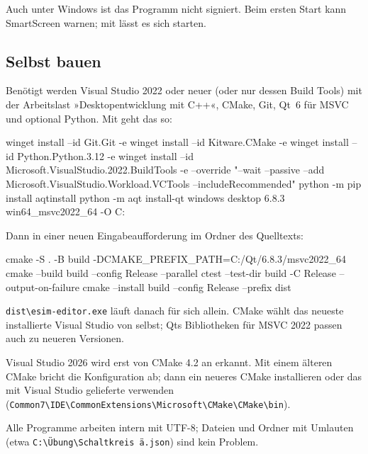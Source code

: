 \begin{hinweis}[SmartScreen]
  Auch unter Windows ist das Programm nicht signiert. Beim ersten Start kann
  SmartScreen warnen; mit \pfad{} lässt es sich starten.
\end{hinweis}

\subsection{Selbst bauen}

Benötigt werden Visual Studio 2022 oder neuer (oder nur dessen Build Tools)
mit der Arbeitslast »Desktopentwicklung mit C++«, CMake, Git, Qt~6 für MSVC
und optional Python. Mit  geht das so:

\begin{shell}
winget install --id Git.Git -e
winget install --id Kitware.CMake -e
winget install --id Python.Python.3.12 -e
winget install --id Microsoft.VisualStudio.2022.BuildTools -e --override "--wait --passive --add Microsoft.VisualStudio.Workload.VCTools --includeRecommended"
python -m pip install aqtinstall
python -m aqt install-qt windows desktop 6.8.3 win64_msvc2022_64 -O C:\Qt
\end{shell}

Dann in einer neuen Eingabeaufforderung im Ordner des Quelltexts:

\begin{shell}
cmake -S . -B build -DCMAKE_PREFIX_PATH=C:/Qt/6.8.3/msvc2022_64
cmake --build build --config Release --parallel
ctest --test-dir build -C Release --output-on-failure
cmake --install build --config Release --prefix dist
\end{shell}

\texttt{dist\textbackslash esim-editor.exe} läuft danach für sich allein.
CMake wählt das neueste installierte Visual Studio von selbst; Qts
Bibliotheken für MSVC 2022 passen auch zu neueren Versionen.

\begin{achtung}
  Visual Studio 2026 wird erst von CMake 4.2 an erkannt. Mit einem älteren
  CMake bricht die Konfiguration ab; dann ein neueres CMake installieren
  oder das mit Visual Studio gelieferte verwenden
  (\texttt{Common7\textbackslash\allowbreak IDE\textbackslash CommonExtensions\textbackslash Microsoft\textbackslash CMake\textbackslash CMake\textbackslash bin}).
\end{achtung}

Alle Programme arbeiten intern mit UTF-8; Dateien und Ordner mit Umlauten
(etwa \texttt{C:\textbackslash\allowbreak Übung\textbackslash\allowbreak Schaltkreis~ä.json}) sind kein Problem.

